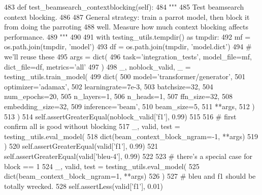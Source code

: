 \begin{DoxyCode}
483     \textcolor{keyword}{def }test\_beamsearch\_contextblocking(self):
484         \textcolor{stringliteral}{"""}
485 \textcolor{stringliteral}{        Test beamsearch context blocking.}
486 \textcolor{stringliteral}{}
487 \textcolor{stringliteral}{        General strategy: train a parrot model, then block it from doing the parroting}
488 \textcolor{stringliteral}{        well. Measure how much context blocking affects performance.}
489 \textcolor{stringliteral}{        """}
490 
491         with testing\_utils.tempdir() \textcolor{keyword}{as} tmpdir:
492             mf = os.path.join(tmpdir, \textcolor{stringliteral}{'model'})
493             df = os.path.join(tmpdir, \textcolor{stringliteral}{'model.dict'})
494             \textcolor{comment}{# we'll reuse these}
495             args = dict(
496                 task=\textcolor{stringliteral}{'integration\_tests'}, model\_file=mf, dict\_file=df, metrics=\textcolor{stringliteral}{'all'}
497             )
498             \_, noblock\_valid, \_ = testing\_utils.train\_model(
499                 dict(
500                     model=\textcolor{stringliteral}{'transformer/generator'},
501                     optimizer=\textcolor{stringliteral}{'adamax'},
502                     learningrate=7e-3,
503                     batchsize=32,
504                     num\_epochs=20,
505                     n\_layers=1,
506                     n\_heads=1,
507                     ffn\_size=32,
508                     embedding\_size=32,
509                     inference=\textcolor{stringliteral}{'beam'},
510                     beam\_size=5,
511                     **args,
512                 )
513             )
514             self.assertGreaterEqual(noblock\_valid[\textcolor{stringliteral}{'f1'}], 0.99)
515 
516             \textcolor{comment}{# first confirm all is good without blocking}
517             \_, valid, test = testing\_utils.eval\_model(
518                 dict(beam\_context\_block\_ngram=-1, **args)
519             )
520             self.assertGreaterEqual(valid[\textcolor{stringliteral}{'f1'}], 0.99)
521             self.assertGreaterEqual(valid[\textcolor{stringliteral}{'bleu-4'}], 0.99)
522 
523             \textcolor{comment}{# there's a special case for block == 1}
524             \_, valid, test = testing\_utils.eval\_model(
525                 dict(beam\_context\_block\_ngram=1, **args)
526             )
527             \textcolor{comment}{# bleu and f1 should be totally wrecked.}
528             self.assertLess(valid[\textcolor{stringliteral}{'f1'}], 0.01)

\end{DoxyCode}
